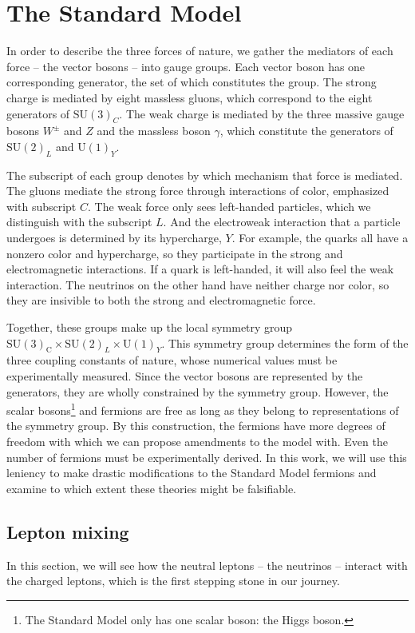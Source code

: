 % 
\section{The Standard Model}\label{ch:SM}
In order to describe the three forces of nature, we gather the mediators of each force -- the vector bosons -- into gauge groups. 
Each vector boson has one corresponding generator, the set of which constitutes the group.
The strong charge is mediated by eight massless gluons, which correspond to the eight generators of $\text{SU}(3)_C$. 
The weak charge is mediated by the three massive gauge bosons $W^\pm$ and $Z$ and the massless boson $\gamma$, 
which constitute the generators of $\text{SU}(2)_L$ and $\text{U}(1)_Y$. 

The subscript of each group denotes by which mechanism that force is mediated. The gluons mediate the strong force through interactions of color, emphasized with subscript $C$. The weak force only sees left-handed particles, 
which we distinguish with the subscript $L$. And the electroweak interaction that a particle undergoes is determined by its hypercharge, $Y$. For example, the quarks all have a nonzero color and hypercharge, 
so they participate in the strong and electromagnetic interactions. If a quark is left-handed, it will also feel the weak interaction. The neutrinos on the other hand have neither charge nor color, so they are insivible to both the strong and electromagnetic force.

Together, these groups make up the local symmetry group $\mathrm{SU}(3)_{\mathrm{C}} \times \mathrm{SU}(2)_{L} \times \mathrm{U}(1)_{Y}$. 
This symmetry group determines the form of the three coupling constants of nature, whose numerical values must be experimentally measured. 
Since the vector bosons are represented by the generators, they are wholly constrained by the symmetry group. However, the scalar bosons\footnote{The Standard Model only has one scalar boson: the Higgs boson.} and fermions are free as long as they
belong to representations of the symmetry group. By this construction, the fermions have more degrees of freedom with which we can propose amendments to the model with. Even the
number of fermions must be experimentally derived. In this work,
we will use this leniency to make drastic modifications to the Standard Model fermions and examine to which extent these theories might be falsifiable.


\subsection{Lepton mixing}
In this section, we will see how the neutral leptons -- the neutrinos -- interact with the charged leptons, 
which is the first stepping stone in our journey.

